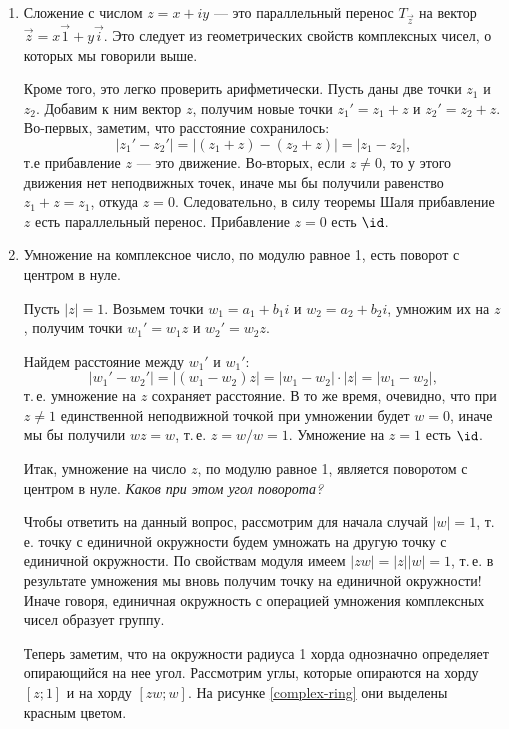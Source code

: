 \begin{enumerate}


\item Сложение с числом $z=x+iy$ --- это параллельный перенос $T_{\vec z}$ на вектор $\vec z=x\vec 1+y\vec i$. Это следует из геометрических свойств комплексных чисел, о которых мы говорили выше.

Кроме того, это легко проверить арифметически. Пусть даны две точки $z_1$ и $z_2$. Добавим к ним вектор $z$, получим новые точки $z_1'=z_1+z$ и $z_2'=z_2+z$. Во-первых, заметим, что расстояние сохранилось:
$$
|z_1'-z_2'| = |(z_1+z)-(z_2+z)| = |z_1-z_2|,
$$
т.е прибавление $z$ --- это движение. Во-вторых, если $z\ne 0$, то у этого движения нет неподвижных точек, иначе мы бы получили равенство $z_1+z=z_1$, откуда $z=0$. Следовательно, в силу теоремы Шаля прибавление $z$ есть параллельный перенос. Прибавление $z=0$ есть $\id$.

\item Умножение на комплексное число, по модулю равное 1, есть поворот с центром в нуле.

Пусть $|z|=1$. Возьмем точки $w_1=a_1+b_1i$ и $w_2=a_2+b_2i$,  умножим их на $z$, получим точки $w_1'=w_1z$ и $w_2'=w_2z$.

Найдем расстояние между $w_1'$ и $w_1'$:
$$
|w_1'-w_2'|=|(w_1-w_2)z|=|w_1-w_2|\cdot|z|=|w_1-w_2|,
$$
т.\,е. умножение на $z$ сохраняет расстояние. В то же время, очевидно, что при $z\ne 1$ единственной неподвижной точкой при умножении будет $w=0$, иначе мы бы получили $wz=w$, т.\,е. $z=w/w=1$. Умножение на $z=1$ есть $\id$.

Итак, умножение на число $z$, по модулю равное 1, является поворотом с центром в нуле. \textit{Каков при этом угол поворота?} 

Чтобы ответить на данный вопрос, рассмотрим для начала случай $|w|=1$, т.\,е. точку с единичной окружности будем умножать на другую точку с единичной окружности. По свойствам модуля имеем $|zw|=|z||w|=1$, т.\,е. в результате умножения мы вновь получим точку на единичной окружности! Иначе говоря, единичная окружность с операцией умножения комплексных чисел образует группу.

Теперь заметим, что на окружности радиуса 1 хорда однозначно определяет опирающийся на нее угол. Рассмотрим углы, которые опираются на хорду $[z;1]$ и на хорду $[zw;w]$. На рисунке \ref{complex-ring} они выделены красным цветом.


\end{enumerate}
